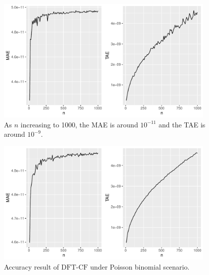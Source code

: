 \documentclass[12pt]{article}
\newcommand{\dft}{{\textrm{DFT-CF}}}
\begin{document}
\begin{figure}%
\begin{center}
\includegraphics[width=0.95\textwidth]{figures/binom.pdf}
\caption{As $n$ increasing to 1000, the MAE is around $10^{-11}$ and the TAE is around $10^{-9}$.} \label{fig:mae.tae}
\end{center}
\end{figure}


\begin{figure}%
\begin{center}
	\includegraphics[width=0.95\textwidth]{figures/poib.pdf}
	\caption{Accuracy result of $\dft$ under Poisson binomial scenario.}
	\label{fig:dft.vs.pb}
\end{center}
\end{figure}
\end{document}
